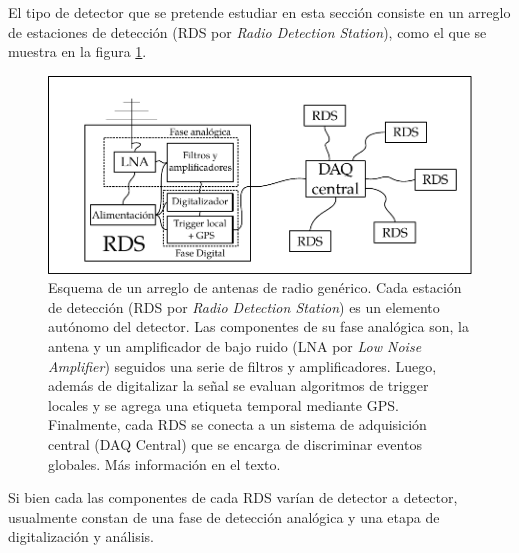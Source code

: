 	El tipo de detector que se pretende estudiar en esta secci\'on consiste en un arreglo de estaciones de detecci\'on (RDS por \emph{Radio Detection Station}), como el que se muestra en la figura \ref{fig:detectorSch}.
		\begin{figure}[ht!]
			\centering
			\includegraphics[width=\textwidth]{./fig/simulacionRadio/antennaSch}
			\caption{\label{fig:detectorSch} Esquema de un arreglo de antenas de radio gen\'erico.
			Cada estaci\'on de detecci\'on (RDS por \emph{Radio Detection Station}) es un elemento aut\'onomo del detector. Las componentes de su fase anal\'ogica son, la antena y un amplificador de bajo ruido (LNA por \emph{Low Noise Amplifier}) seguidos una serie de filtros y amplificadores. Luego, adem\'as de digitalizar la se\~nal se evaluan algoritmos de trigger locales y se agrega una etiqueta temporal mediante GPS.
			Finalmente, cada RDS se conecta a un sistema de adquisici\'on central (DAQ Central) que se encarga de discriminar eventos globales. M\'as informaci\'on en el texto.
			}
			
		\end{figure}
	Si bien cada las componentes de cada RDS var\'ian de detector a detector, usualmente constan de una fase de detecci\'on anal\'ogica y una etapa de digitalizaci\'on y an\'alisis.
